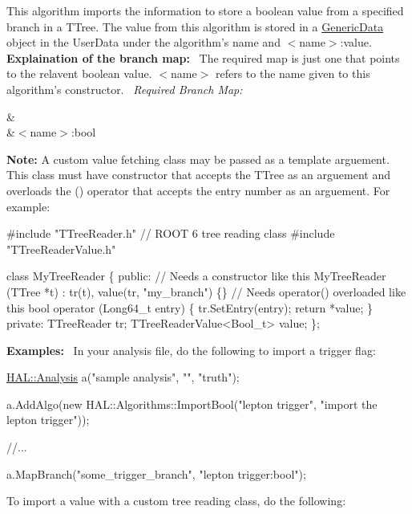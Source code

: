 This algorithm imports the information to store a boolean value from a specified branch in a T\+Tree. The value from this algorithm is stored in a \hyperlink{class_h_a_l_1_1_generic_data}{Generic\+Data} object in the User\+Data under the algorithm's name and $<$name$>$\+:value.~\newline
~\newline
{\bfseries Explaination of the branch map\+:}~\newline
The required map is just one that points to the relavent boolean value. $<$name$>$ refers to the name given to this algorithm's constructor.~\newline
{\itshape Required Branch Map\+:} \begin{TabularC}{2}
\hline
{}&\PBS{}\\
&\PBS\centering $<$name$>$\+:bool \\
\end{TabularC}
{\bfseries Note\+:} A custom value fetching class may be passed as a template arguement. This class must have constructor that accepts the T\+Tree as an arguement and overloads the () operator that accepts the entry number as an arguement. For example\+: 
\begin{DoxyCode}
\textcolor{preprocessor}{#include "TTreeReader.h"} \textcolor{comment}{// ROOT 6 tree reading class}
\textcolor{preprocessor}{#include "TTreeReaderValue.h"}

\textcolor{keyword}{class }MyTreeReader \{
\textcolor{keyword}{public}:
 \textcolor{comment}{// Needs a constructor like this}
 MyTreeReader (TTree *t) : tr(t), value(tr, \textcolor{stringliteral}{"my\_branch"}) \{\}
 \textcolor{comment}{// Needs operator() overloaded like this}
 \textcolor{keywordtype}{bool} operator (Long64\_t entry) \{
   tr.SetEntry(entry);
   \textcolor{keywordflow}{return} *value;
 \}
\textcolor{keyword}{private}:
 TTreeReader tr;
 TTreeReaderValue<Bool\_t> value;
\};
\end{DoxyCode}
 {\bfseries Examples\+:}~\newline
In your analysis file, do the following to import a trigger flag\+:


\begin{DoxyCode}
\hyperlink{class_h_a_l_1_1_analysis}{HAL::Analysis} a(\textcolor{stringliteral}{"sample analysis"}, \textcolor{stringliteral}{""}, \textcolor{stringliteral}{"truth"});

a.AddAlgo(\textcolor{keyword}{new} HAL::Algorithms::ImportBool(\textcolor{stringliteral}{"lepton trigger"}, \textcolor{stringliteral}{"import the lepton trigger"}));

\textcolor{comment}{//...}

a.MapBranch(\textcolor{stringliteral}{"some\_trigger\_branch"}, \textcolor{stringliteral}{"lepton trigger:bool"});
\end{DoxyCode}
 To import a value with a custom tree reading class, do the following\+:


